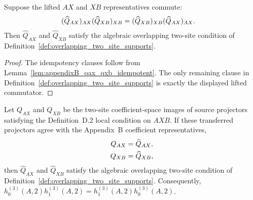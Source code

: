 \begin{lemma}
    \label{lem:appendixB_overlapping_condition_from_lift_commutator}
    \leanok
    Suppose the lifted $AX$ and $XB$ representatives commute:
    \begin{align}
        (\widehat Q_{AX})_{AX}(\widehat Q_{XB})_{XB}
         & =
        (\widehat Q_{XB})_{XB}(\widehat Q_{AX})_{AX}.
        \notag
    \end{align}
    Then $\widehat Q_{AX}$ and $\widehat Q_{XB}$ satisfy the algebraic
    overlapping two-site condition of
    Definition~\ref{def:overlapping_two_site_supports}.
\end{lemma}

\begin{proof}
    \leanok
    The idempotency clauses follow from
    Lemma~\ref{lem:appendixB_qax_qxb_idempotent}. The only remaining clause
    in Definition~\ref{def:overlapping_two_site_supports} is exactly the
    displayed lifted commutator.
\end{proof}

\begin{lemma}
    \label{lem:appendixB_d2_projectors_identified_with_representatives}
    \leanok
    Let $Q_{AX}$ and $Q_{XB}$ be the two-site coefficient-space images of
    source projectors satisfying the Definition~D.2 local condition on
    $A X B$. If these transferred projectors agree with the Appendix~B
    coefficient representatives,
    \begin{align}
        Q_{AX}
         & =\widehat Q_{AX},
        \notag               \\
        Q_{XB}
         & =\widehat Q_{XB},
        \notag
    \end{align}
    then $\widehat Q_{AX}$ and $\widehat Q_{XB}$ satisfy the algebraic
    overlapping two-site condition of
    Definition~\ref{def:overlapping_two_site_supports}. Consequently,
    $h_0^{(3)}(A,2)h_1^{(3)}(A,2) = h_1^{(3)}(A,2)h_0^{(3)}(A,2)$.
\end{lemma}

